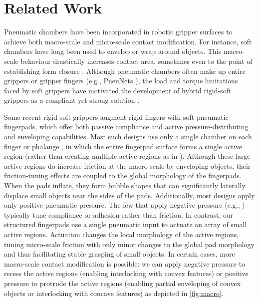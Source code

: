 \section{Related Work}
\label{sec:related}

Pneumatic chambers have been incorporated in robotic gripper surfaces to achieve both macro-scale and micro-scale contact modification.
%
For instance, soft chambers have long been used to envelop or wrap around objects.
%
This macro-scale behaviour drastically increases contact area, sometimes even to the point of establishing form closure \cite{PrattichizzoTrinkleGrasping2008,ShintakeEtAlSoftRoboticGrippers2018}.
%
Although pneumatic chambers often make up entire grippers or gripper fingers (e.g., PneuNets \cite{IlievskiEtAlSoftRoboticsChemists2011}), the load and torque limitations faced by soft grippers have motivated the development of hybrid rigid-soft grippers as a compliant yet strong solution \cite{ChenEtAlSoftrigidCouplingGrippers2023}.

Some recent rigid-soft grippers augment rigid fingers with soft pneumatic fingerpads, which offer both passive compliance and active pressure-distributing and enveloping capabilities.
%
Most such designs use only a single chamber on each finger \cite{TrinhEtAlNovelRigidsoftGripper2024,KeelyEtAlCombiningDecouplingRigid2024,ChoiKocDesignFeasibilityTests2006} or phalange \cite{PozziEtAlSoftPneumaticPads2024}, in which the entire fingerpad surface forms a single active region (rather than creating multiple active regions as in \cite{HeEtAlSoftFingertipsTactile2020}). 
%
Although these large active regions do increase friction at the macro-scale by enveloping objects, their friction-tuning effects are coupled to the global morphology of the fingerpads. 
%
When the pads inflate, they form bubble shapes that can significantly laterally displace small objects near the sides of the pads.
%
Additionally, most designs apply only positive pneumatic pressure. 
%
The few that apply negative pressure (e.g., \cite{KeelyEtAlCombiningDecouplingRigid2024}) typically tune compliance or adhesion rather than friction. 
%
In contrast, our structured fingerpads use a single pneumatic input to actuate an array of small active regions. 
%
Actuation changes the local morphology of the active regions, tuning micro-scale friction with only minor changes to the global pad morphology and thus facilitating stable grasping of small objects. 
%
In certain cases, more macro-scale contact modification is possible: we can apply negative pressure to recess the active regions (enabling interlocking with convex features) or positive pressure to protrude the active regions (enabling partial enveloping of convex objects or interlocking with concave features) as depicted in \cref{fig:macro}. 

